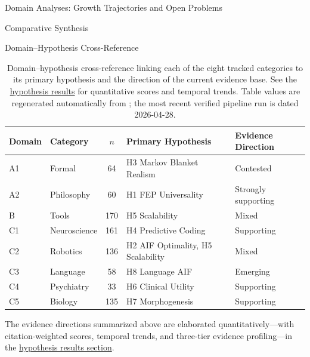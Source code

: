 \documentclass[
  ignorenonframetext,
]{beamer}
\begin{document}
\begin{frame}[allowframebreaks]{Domain Analyses: Growth Trajectories and
Open Problems \label{sec:subfield_analyses}}
\begin{block}{Comparative Synthesis}
\begin{block}{Domain--Hypothesis Cross-Reference}
\begin{table}[htbp]
\centering
\caption[Domain--hypothesis cross-reference]{Domain--hypothesis cross-reference linking each of the eight tracked categories to its primary hypothesis and the direction of the current evidence base. See the \hyperref[sec:hypothesis_results]{hypothesis results} for quantitative scores and temporal trends. Table values are regenerated automatically from ; the most recent verified pipeline run is dated 2026-04-28.}
\label{tab:domain_hypothesis_crossref}
\begin{tabular}{llcll}
\toprule
\textbf{Domain} & \textbf{Category} & $n$ & \textbf{Primary Hypothesis} & \textbf{Evidence Direction} \\
\midrule
A1 & Formal & 64 & H3 Markov Blanket Realism & Contested \\
A2 & Philosophy & 60 & H1 FEP Universality & Strongly supporting \\
B & Tools & 170 & H5 Scalability & Mixed \\
C1 & Neuroscience & 161 & H4 Predictive Coding & Supporting \\
C2 & Robotics & 136 & H2 AIF Optimality, H5 Scalability & Mixed \\
C3 & Language & 58 & H8 Language AIF & Emerging \\
C4 & Psychiatry & 33 & H6 Clinical Utility & Supporting \\
C5 & Biology & 135 & H7 Morphogenesis & Supporting \\
\bottomrule
\end{tabular}
\end{table}

The evidence directions summarized above are elaborated
quantitatively---with citation-weighted scores, temporal trends, and
three-tier evidence profiling---in the
\hyperref[sec:hypothesis_results]{hypothesis results section}.
\end{block}
\end{block}
\end{frame}
\end{document}
